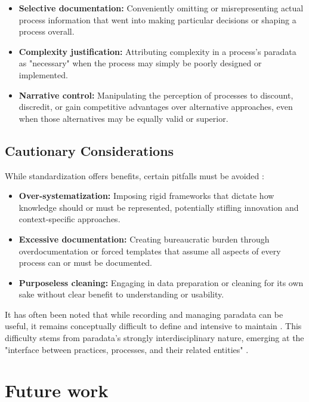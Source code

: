 \begin{itemize}
    \item \textbf{Selective documentation:} Conveniently omitting or misrepresenting actual process information that went into making particular decisions or shaping a process overall.
    \item \textbf{Complexity justification:} Attributing complexity in a process's paradata as "necessary" when the process may simply be poorly designed or implemented.
    \item \textbf{Narrative control:} Manipulating the perception of processes to discount, discredit, or gain competitive advantages over alternative approaches, even when those alternatives may be equally valid or superior.
\end{itemize}


\subsection{Cautionary Considerations}
While standardization offers benefits, certain pitfalls must be avoided \cite{huvila_perspectives_2024}:

\begin{itemize}
    \item \textbf{Over-systematization:} Imposing rigid frameworks that dictate how knowledge should or must be represented, potentially stifling innovation and context-specific approaches.
    \item \textbf{Excessive documentation:} Creating bureaucratic burden through overdocumentation or forced templates that assume all aspects of every process can or must be documented.
    \item \textbf{Purposeless cleaning:} Engaging in data preparation or cleaning for its own sake without clear benefit to understanding or usability.
\end{itemize}

It has often been noted that while recording and managing paradata can be useful, it remains conceptually difficult to define and intensive to maintain \cite{cohen_paradata_2024}. This difficulty stems from paradata's strongly interdisciplinary nature, emerging at the "interface between practices, processes, and their related entities" \cite{huvila_perspectives_2024}.

\section{Future work}


